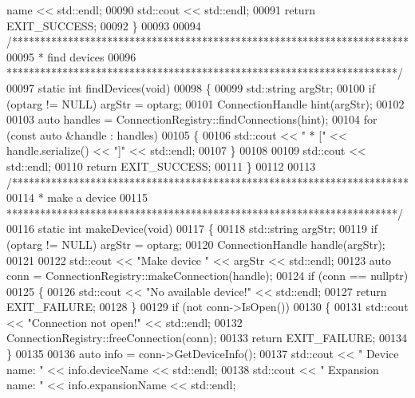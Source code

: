\begin{DoxyCode}
      name << std::endl;
00090     std::cout << std::endl;
00091     \textcolor{keywordflow}{return} EXIT\_SUCCESS;
00092 \}
00093 
00094 \textcolor{comment}{/***********************************************************************}
00095 \textcolor{comment}{ * find devices}
00096 \textcolor{comment}{ **********************************************************************/}
00097 \textcolor{keyword}{static} \textcolor{keywordtype}{int} findDevices(\textcolor{keywordtype}{void})
00098 \{
00099     std::string argStr;
00100     \textcolor{keywordflow}{if} (optarg != NULL) argStr = optarg;
00101     ConnectionHandle hint(argStr);
00102 
00103     \textcolor{keyword}{auto} handles = ConnectionRegistry::findConnections(hint);
00104     \textcolor{keywordflow}{for} (\textcolor{keyword}{const} \textcolor{keyword}{auto} &handle : handles)
00105     \{
00106         std::cout << \textcolor{stringliteral}{"  * ["} << handle.serialize() << \textcolor{stringliteral}{"]"} << std::endl;
00107     \}
00108 
00109     std::cout << std::endl;
00110     \textcolor{keywordflow}{return} EXIT\_SUCCESS;
00111 \}
00112 
00113 \textcolor{comment}{/***********************************************************************}
00114 \textcolor{comment}{ * make a device}
00115 \textcolor{comment}{ **********************************************************************/}
00116 \textcolor{keyword}{static} \textcolor{keywordtype}{int} makeDevice(\textcolor{keywordtype}{void})
00117 \{
00118     std::string argStr;
00119     \textcolor{keywordflow}{if} (optarg != NULL) argStr = optarg;
00120     ConnectionHandle handle(argStr);
00121 
00122     std::cout << \textcolor{stringliteral}{"Make device "} << argStr << std::endl;
00123     \textcolor{keyword}{auto} conn = ConnectionRegistry::makeConnection(handle);
00124     \textcolor{keywordflow}{if} (conn == \textcolor{keyword}{nullptr})
00125     \{
00126         std::cout << \textcolor{stringliteral}{"No available device!"} << std::endl;
00127         \textcolor{keywordflow}{return} EXIT\_FAILURE;
00128     \}
00129     \textcolor{keywordflow}{if} (not conn->IsOpen())
00130     \{
00131         std::cout << \textcolor{stringliteral}{"Connection not open!"} << std::endl;
00132         ConnectionRegistry::freeConnection(conn);
00133         \textcolor{keywordflow}{return} EXIT\_FAILURE;
00134     \}
00135 
00136     \textcolor{keyword}{auto} info = conn->GetDeviceInfo();
00137     std::cout << \textcolor{stringliteral}{"  Device name: "} << info.deviceName << std::endl;
00138     std::cout << \textcolor{stringliteral}{"  Expansion name: "} << info.expansionName << std::endl;

\end{DoxyCode}
